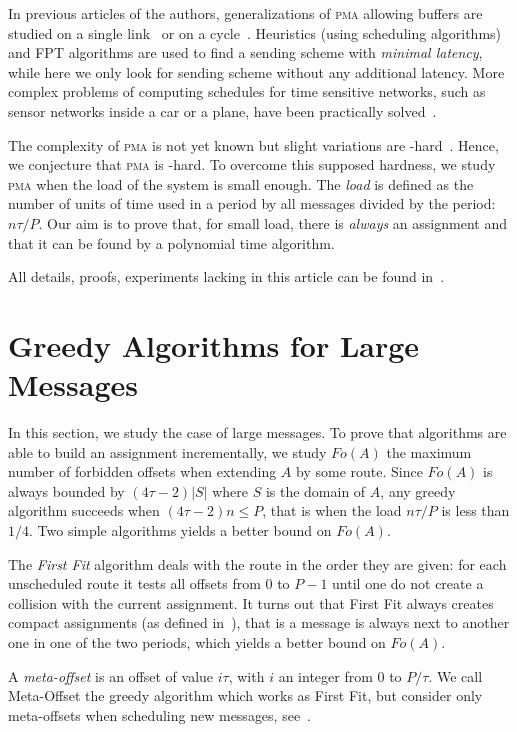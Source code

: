 \documentclass[10pt, conference, letterpaper]{algotel}
\newcommand\pma{\textsc{pma}\xspace}
\begin{document}
In previous articles of the authors, generalizations of \pma allowing buffers are studied on a single link~\cite{barth2018deterministic} or on a cycle~\cite{Guir1905:Deterministic}. Heuristics (using scheduling algorithms) and FPT algorithms are used to find a sending scheme with \emph{minimal latency}, while here we only look for sending scheme without any additional latency. More complex problems of computing schedules for time sensitive networks, such as sensor networks inside a car or a plane, have been practically solved~\cite{nayak2017incremental,steiner2018traffic}. 

The complexity of \pma is not yet known but slight variations are \NP-hard~\cite{barth2018deterministic}.  Hence, we conjecture that \pma is \NP-hard.
To overcome this supposed hardness, we study \pma when the load of the system is small enough. The \emph{load} is defined as the number of units of time used in a period by all messages divided by the period: $n\tau /P$. Our aim is to prove that, for small load, there is \emph{always} an assignment and that it can be found by a polynomial time algorithm.

All details, proofs, experiments lacking in this article can be found in~\cite{}.

\section{Greedy Algorithms for Large Messages} \label{sec:large}

In this section, we study the case of large messages. To prove that algorithms are able to build an assignment incrementally, we study $Fo(A)$ the maximum number of forbidden offsets when extending $A$ by some route.
Since $Fo(A)$ is always bounded by $(4 \tau -2)|S|$ where $S$ is the domain of $A$, any greedy algorithm succeeds when $(4 \tau -2)n \leq P$, that is when the load $n\tau /P$ is less than $1/4$. Two simple algorithms yields a better bound on $Fo(A)$.

The \emph{First Fit} algorithm deals with the route in the order they are given:  for each unscheduled route it tests all offsets from $0$ to $P-1$ until one do not create a collision with the current assignment. It turns out that First Fit always creates compact assignments (as defined in~\cite{barth2018deterministic}), that is a message is always next to another one in one of the two periods, which yields a better bound on $Fo(A)$.

A \emph{meta-offset} is an offset of value $i\tau$, with $i$ an integer from $0$ to $P / \tau$. We call Meta-Offset the greedy algorithm which works as First Fit, but consider only meta-offsets when scheduling new messages, see~\cite{barth2018deterministic}.
\end{document}
